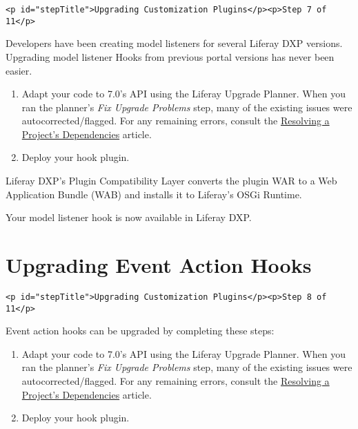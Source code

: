 \begin{verbatim}
<p id="stepTitle">Upgrading Customization Plugins</p><p>Step 7 of 11</p>
\end{verbatim}

Developers have been creating model listeners for several Liferay DXP
versions. Upgrading model listener Hooks from previous portal versions
has never been easier.

\begin{enumerate}
\def\labelenumi{\arabic{enumi}.}
\item
  Adapt your code to 7.0's API using the Liferay Upgrade Planner. When
  you ran the planner's \emph{Fix Upgrade Problems} step, many of the
  existing issues were autocorrected/flagged. For any remaining errors,
  consult the
  \href{/docs/7-2/tutorials/-/knowledge_base/t/resolving-a-projects-dependencies}{Resolving
  a Project's Dependencies} article.
\item
  Deploy your hook plugin.
\end{enumerate}

Liferay DXP's Plugin Compatibility Layer converts the plugin WAR to a
Web Application Bundle (WAB) and installs it to Liferay's OSGi Runtime.

Your model listener hook is now available in Liferay DXP.

\chapter{Upgrading Event Action
Hooks}\label{upgrading-event-action-hooks}

\begin{verbatim}
<p id="stepTitle">Upgrading Customization Plugins</p><p>Step 8 of 11</p>
\end{verbatim}

Event action hooks can be upgraded by completing these steps:

\begin{enumerate}
\def\labelenumi{\arabic{enumi}.}
\item
  Adapt your code to 7.0's API using the Liferay Upgrade Planner. When
  you ran the planner's \emph{Fix Upgrade Problems} step, many of the
  existing issues were autocorrected/flagged. For any remaining errors,
  consult the
  \href{/docs/7-2/tutorials/-/knowledge_base/t/resolving-a-projects-dependencies}{Resolving
  a Project's Dependencies} article.
\item
  Deploy your hook plugin.
\end{enumerate}

